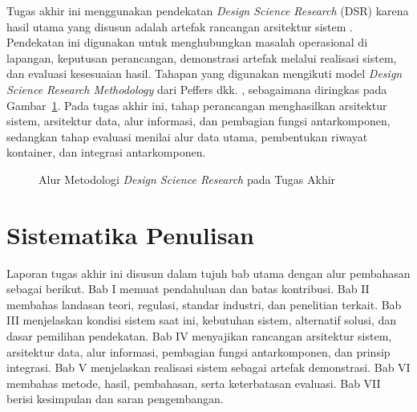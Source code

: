 Tugas akhir ini menggunakan pendekatan \textit{Design Science Research} (DSR)
karena hasil utama yang disusun adalah artefak rancangan arsitektur sistem
\autocite{hevner2004design,peffers2007dsrm}. Pendekatan ini digunakan untuk
menghubungkan masalah operasional di lapangan, keputusan perancangan,
demonstrasi artefak melalui realisasi sistem, dan evaluasi kesesuaian hasil.
Tahapan yang digunakan mengikuti model \textit{Design Science Research
Methodology} dari Peffers dkk. \autocite{peffers2007dsrm}, sebagaimana
diringkas pada Gambar~\ref{fig:metodologi-dsr}. Pada tugas akhir ini, tahap
perancangan menghasilkan arsitektur sistem, arsitektur data, alur informasi,
dan pembagian fungsi antarkomponen, sedangkan tahap evaluasi menilai alur data
utama, pembentukan riwayat kontainer, dan integrasi antarkomponen.

\begin{figure}[ht]
  \centering
  \caption{Alur Metodologi \textit{Design Science Research} pada Tugas Akhir}
  \label{fig:metodologi-dsr}
\end{figure}

\FloatBarrier

\section{Sistematika Penulisan}

Laporan tugas akhir ini disusun dalam tujuh bab utama dengan alur pembahasan
sebagai berikut. Bab I memuat pendahuluan dan batas kontribusi. Bab II
membahas landasan teori, regulasi, standar industri, dan penelitian terkait.
Bab III menjelaskan kondisi sistem saat ini, kebutuhan sistem, alternatif
solusi, dan dasar pemilihan pendekatan. Bab IV menyajikan rancangan arsitektur
sistem, arsitektur data, alur informasi, pembagian fungsi antarkomponen, dan
prinsip integrasi. Bab V menjelaskan realisasi sistem sebagai artefak
demonstrasi. Bab VI membahas metode, hasil, pembahasan, serta keterbatasan
evaluasi. Bab VII berisi kesimpulan dan saran pengembangan.
